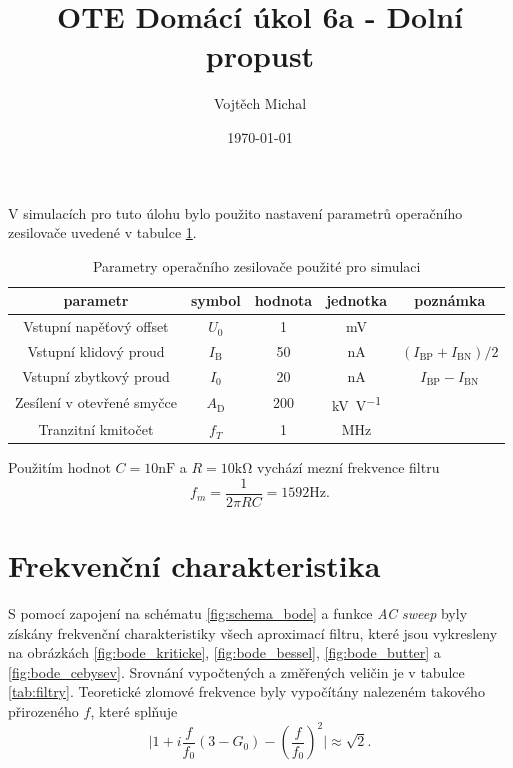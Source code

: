 \documentclass[twoside]{article}
\title{OTE Domácí úkol 6a - Dolní propust}
\author{Vojtěch Michal}
\date{\today}
\begin{document}
\maketitle

V simulacích pro tuto úlohu bylo použito nastavení parametrů operačního zesilovače uvedené v tabulce \ref{tab:oz_param}.

\begin{table}[h!]
    \centering
    \begin{tabular}{c|c|c|c|c}
        parametr & symbol & hodnota & jednotka & poznámka\\
        \hline
        Vstupní napěťový offset & $U_0$ & 1 & \si{\milli\volt} & \\
        Vstupní klidový proud & $I_\text{B}$ & 50 & \si{\nano\ampere} & $(I_\text{BP} + I_\text{BN})/2$ \\
        Vstupní zbytkový proud & $I_0$ & 20 & \si{\nano\ampere} & $I_\text{BP} - I_\text{BN}$ \\
        Zesílení v otevřené smyčce & $A_\text{D}$ & 200 & \si{\kilo\volt\per\volt} & \\
        Tranzitní kmitočet& $f_T$ & 1 & \si{\mega\hertz} &
    \end{tabular}
    \caption{Parametry operačního zesilovače použité pro simulaci}
    \label{tab:oz_param}
\end{table}

Použitím hodnot $C = 10 \si{\nano\farad}$ a $R = 10 \si{\kilo\ohm}$
vychází mezní frekvence filtru
\begin{equation}
    f_m = \frac{1}{2 \pi R C} = 1592 \si{\hertz}.
\end{equation}

\section{Frekvenční charakteristika}

S pomocí zapojení na schématu \ref{fig:schema_bode} a funkce \textit{AC sweep} byly
získány frekvenční charakteristiky všech aproximací filtru,
které jsou vykresleny na obrázkách \ref{fig:bode_kriticke}, \ref{fig:bode_bessel}, \ref{fig:bode_butter} a \ref{fig:bode_cebysev}.
Srovnání vypočtených a změřených veličin je v tabulce \ref{tab:filtry}.
Teoretické zlomové frekvence byly vypočítány nalezeném takového přirozeného $f$, které splňuje
\begin{equation}
    \vert1+i\frac{f}{f_0} (3-G_0) - (\frac{f}{f_0})^2 \vert \approx \sqrt{2}.
\end{equation}
\end{document}
